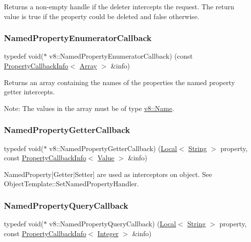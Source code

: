 Returns a non-\/empty handle if the deleter intercepts the request. The return value is true if the property could be deleted and false otherwise. \mbox{\label{namespacev8_a5f6f16818a9cddacadbfe6d90ca3a6b1}} 
\subsubsection{\texorpdfstring{Named\+Property\+Enumerator\+Callback}{NamedPropertyEnumeratorCallback}}
{\footnotesize\ttfamily typedef void($\ast$ v8\+::\+Named\+Property\+Enumerator\+Callback) (const \mbox{\hyperlink{classv8_1_1PropertyCallbackInfo}{Property\+Callback\+Info}}$<$ \mbox{\hyperlink{classv8_1_1Array}{Array}} $>$ \&info)}

Returns an array containing the names of the properties the named property getter intercepts.

Note\+: The values in the array must be of type \mbox{\hyperlink{classv8_1_1Name}{v8\+::\+Name}}. \mbox{\label{namespacev8_a50cae386a68bf9ff23d02aa1161face4}} 
\subsubsection{\texorpdfstring{Named\+Property\+Getter\+Callback}{NamedPropertyGetterCallback}}
{\footnotesize\ttfamily typedef void($\ast$ v8\+::\+Named\+Property\+Getter\+Callback) (\mbox{\hyperlink{classv8_1_1Local}{Local}}$<$ \mbox{\hyperlink{classv8_1_1String}{String}} $>$ property, const \mbox{\hyperlink{classv8_1_1PropertyCallbackInfo}{Property\+Callback\+Info}}$<$ \mbox{\hyperlink{classv8_1_1Value}{Value}} $>$ \&info)}

Named\+Property\mbox{[}Getter$\vert$\+Setter\mbox{]} are used as interceptors on object. See Object\+Template\+::\+Set\+Named\+Property\+Handler. \mbox{\label{namespacev8_ac135beae5f0c8b290255accb438f990e}} 
\subsubsection{\texorpdfstring{Named\+Property\+Query\+Callback}{NamedPropertyQueryCallback}}
{\footnotesize\ttfamily typedef void($\ast$ v8\+::\+Named\+Property\+Query\+Callback) (\mbox{\hyperlink{classv8_1_1Local}{Local}}$<$ \mbox{\hyperlink{classv8_1_1String}{String}} $>$ property, const \mbox{\hyperlink{classv8_1_1PropertyCallbackInfo}{Property\+Callback\+Info}}$<$ \mbox{\hyperlink{classv8_1_1Integer}{Integer}} $>$ \&info)}

